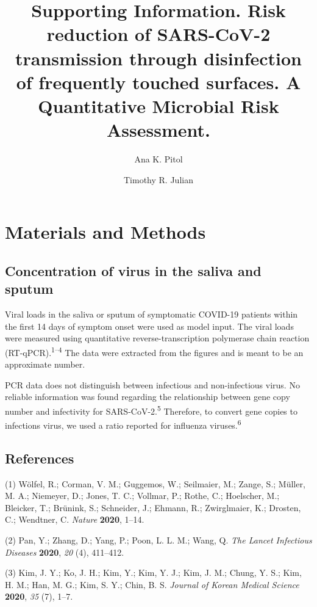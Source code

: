 \documentclass[journal=jacsat,manuscript=article]{achemso}
\author{Ana K. Pitol}
\affiliation{Department of Civil and Environmental Engineering, Imperial College
London, United Kingdom}
\author{Timothy R. Julian}
\affiliation{Department of Environmental Microbiology, Eawag, Dubendorf, Switzerland}
\title[An \textsf{achemso} demo]{Supporting Information. Risk reduction of SARS-CoV-2 transmission
through disinfection of frequently touched surfaces. A Quantitative
Microbial Risk Assessment.}
\begin{document}
\begin{abstract}

\end{abstract}
\hypertarget{materials-and-methods}{%
\section{Materials and Methods}\label{materials-and-methods}}

\hypertarget{concentration-of-virus-in-the-saliva-and-sputum}{%
\subsection{Concentration of virus in the saliva and
sputum}\label{concentration-of-virus-in-the-saliva-and-sputum}}

Viral loads in the saliva or sputum of symptomatic COVID-19 patients
within the first 14 days of symptom onset were used as model input. The
viral loads were measured using quantitative reverse-transcription
polymerase chain reaction (RT-qPCR).\textsuperscript{1--4} The data were
extracted from the figures and is meant to be an approximate number.

PCR data does not distinguish between infectious and non-infectious
virus. No reliable information was found regarding the relationship
between gene copy number and infectivity for
SARS-CoV-2.\textsuperscript{5} Therefore, to convert gene copies to
infections virus, we used a ratio reported for influenza
viruses.\textsuperscript{6}

\hypertarget{references}{%
\subsection*{References}\label{references}}

\hypertarget{refs}{}
\leavevmode\hypertarget{ref-Wolfel2020}{}%
(1) Wölfel, R.; Corman, V. M.; Guggemos, W.; Seilmaier, M.; Zange, S.;
Müller, M. A.; Niemeyer, D.; Jones, T. C.; Vollmar, P.; Rothe, C.;
Hoelscher, M.; Bleicker, T.; Brünink, S.; Schneider, J.; Ehmann, R.;
Zwirglmaier, K.; Drosten, C.; Wendtner, C. \emph{Nature} \textbf{2020},
1--14.

\leavevmode\hypertarget{ref-Pan2020}{}%
(2) Pan, Y.; Zhang, D.; Yang, P.; Poon, L. L. M.; Wang, Q. \emph{The
Lancet Infectious Diseases} \textbf{2020}, \emph{20} (4), 411--412.

\leavevmode\hypertarget{ref-Kim2020}{}%
(3) Kim, J. Y.; Ko, J. H.; Kim, Y.; Kim, Y. J.; Kim, J. M.; Chung, Y.
S.; Kim, H. M.; Han, M. G.; Kim, S. Y.; Chin, B. S. \emph{Journal of
Korean Medical Science} \textbf{2020}, \emph{35} (7), 1--7.
\end{document}
